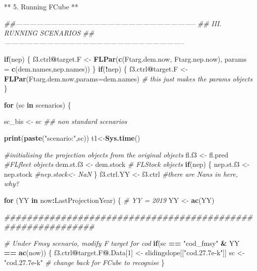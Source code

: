 \documentclass[
]{article}
\newenvironment{Shaded}{\begin{snugshade}}{\end{snugshade}}
\newcommand{\CommentTok}[1]{\textcolor[rgb]{0.56,0.35,0.01}{\textit{#1}}}
\newcommand{\ControlFlowTok}[1]{\textcolor[rgb]{0.13,0.29,0.53}{\textbf{#1}}}
\newcommand{\DataTypeTok}[1]{\textcolor[rgb]{0.13,0.29,0.53}{#1}}
\newcommand{\DecValTok}[1]{\textcolor[rgb]{0.00,0.00,0.81}{#1}}
\newcommand{\KeywordTok}[1]{\textcolor[rgb]{0.13,0.29,0.53}{\textbf{#1}}}
\newcommand{\NormalTok}[1]{#1}
\newcommand{\OperatorTok}[1]{\textcolor[rgb]{0.81,0.36,0.00}{\textbf{#1}}}
\newcommand{\StringTok}[1]{\textcolor[rgb]{0.31,0.60,0.02}{#1}}
\begin{document}
** 5. Running FCube **

\begin{Shaded}
\begin{Highlighting}[]
\CommentTok{##-----------------------------------------------------------------------------}
\CommentTok{## III. RUNNING SCENARIOS}
\CommentTok{##-----------------------------------------------------------------------------}

\ControlFlowTok{if}\NormalTok{(nep) \{}
\NormalTok{    f3.ctrl}\OperatorTok{@}\NormalTok{target.F <-}\StringTok{  }\KeywordTok{FLPar}\NormalTok{(}\KeywordTok{c}\NormalTok{(Ftarg.dem.now, Ftarg.nep.now), }\DataTypeTok{params =} \KeywordTok{c}\NormalTok{(dem.names,nep.names))}
\NormalTok{\}}
\ControlFlowTok{if}\NormalTok{(}\OperatorTok{!}\NormalTok{nep) \{}
\NormalTok{f3.ctrl}\OperatorTok{@}\NormalTok{target.F   <-}\StringTok{  }\KeywordTok{FLPar}\NormalTok{(Ftarg.dem.now,}\DataTypeTok{params=}\NormalTok{dem.names) }\CommentTok{# this just makes the params objects}
\NormalTok{\}}

\ControlFlowTok{for}\NormalTok{ (sc }\ControlFlowTok{in}\NormalTok{ scenarios) \{}
  
\NormalTok{  sc_bis <-}\StringTok{ }\NormalTok{sc }\CommentTok{## non standard scenarios}

  \KeywordTok{print}\NormalTok{(}\KeywordTok{paste}\NormalTok{(}\StringTok{"scenario:"}\NormalTok{,sc))}
\NormalTok{  t1<-}\KeywordTok{Sys.time}\NormalTok{()}

    \CommentTok{#initialising the projection objects from the original objects}
\NormalTok{    fl.f3 <-}\StringTok{ }\NormalTok{fl.pred }\CommentTok{#FLfleet objects}
\NormalTok{    dem.st.f3 <-}\StringTok{ }\NormalTok{dem.stock }\CommentTok{# FLStock objects}
    \ControlFlowTok{if}\NormalTok{(nep) \{}
\NormalTok{    nep.st.f3 <-}\StringTok{ }\NormalTok{nep.stock  }\CommentTok{#nep.stock<- NaN}
\NormalTok{    \}}
\NormalTok{    f3.ctrl.YY <-}\StringTok{ }\NormalTok{f3.ctrl  }\CommentTok{#there are Nans in here, why?}

    \ControlFlowTok{for}\NormalTok{ (YY }\ControlFlowTok{in}\NormalTok{ now}\OperatorTok{:}\NormalTok{LastProjectionYear) \{ }\CommentTok{# YY = 2019}
\NormalTok{        YY <-}\StringTok{ }\KeywordTok{ac}\NormalTok{(YY)}

\CommentTok{############################################################}
        
  \CommentTok{# Under Fmsy scenario, modify F target for cod}
    \ControlFlowTok{if}\NormalTok{(sc }\OperatorTok{==}\StringTok{ "cod_fmsy"} \OperatorTok{&}\StringTok{ }\NormalTok{YY }\OperatorTok{==}\StringTok{ }\KeywordTok{ac}\NormalTok{(now)) \{}
\NormalTok{      f3.ctrl}\OperatorTok{@}\NormalTok{target.F}\OperatorTok{@}\NormalTok{.Data[}\DecValTok{1}\NormalTok{] <-}\StringTok{ }\NormalTok{slidingslope[[}\StringTok{"cod.27.7e-k"}\NormalTok{]] }
\NormalTok{      sc <-}\StringTok{ "cod.27.7e-k"}  \CommentTok{# change back for FCube to recognise}
\NormalTok{      \}}
        

\end{Highlighting}
\end{Shaded}
\end{document}

